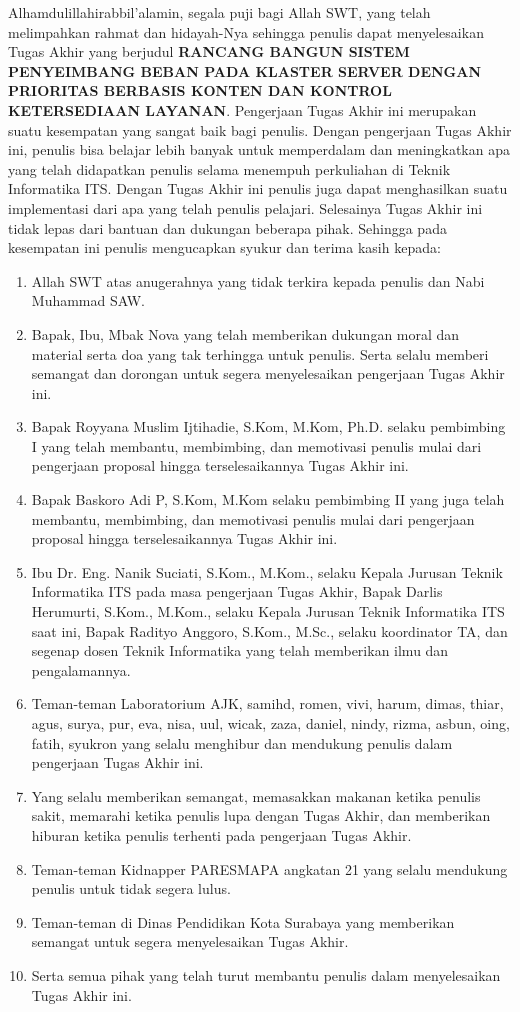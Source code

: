 \documentclass{ta-its}
\begin{document}
        Alhamdulillahirabbil’alamin, segala puji bagi Allah SWT, yang telah melimpahkan rahmat dan hidayah-Nya sehingga penulis dapat menyelesaikan Tugas Akhir yang berjudul \textbf{RANCANG BANGUN SISTEM PENYEIMBANG BEBAN PADA KLASTER SERVER DENGAN PRIORITAS BERBASIS KONTEN DAN KONTROL KETERSEDIAAN LAYANAN}. Pengerjaan Tugas Akhir ini merupakan suatu kesempatan yang sangat baik bagi penulis. Dengan pengerjaan Tugas Akhir ini, penulis bisa belajar lebih banyak untuk memperdalam dan meningkatkan apa yang telah didapatkan penulis selama menempuh perkuliahan di Teknik Informatika ITS. Dengan Tugas Akhir ini penulis juga dapat menghasilkan suatu implementasi dari apa yang telah penulis pelajari.
        Selesainya Tugas Akhir ini tidak lepas dari bantuan dan dukungan beberapa pihak. Sehingga pada kesempatan ini penulis mengucapkan syukur dan terima kasih kepada:
        \begin{enumerate}
        	\item Allah SWT atas anugerahnya yang tidak terkira kepada penulis dan Nabi Muhammad SAW.
        	\item Bapak, Ibu, Mbak Nova yang telah memberikan dukungan moral dan material serta doa yang tak terhingga untuk penulis. Serta selalu memberi semangat dan dorongan untuk segera menyelesaikan pengerjaan Tugas Akhir ini.
        	\item Bapak Royyana Muslim Ijtihadie, S.Kom, M.Kom, Ph.D. selaku pembimbing I yang telah membantu, membimbing, dan memotivasi penulis mulai dari pengerjaan proposal hingga terselesaikannya Tugas Akhir ini.
        	\item Bapak Baskoro Adi P, S.Kom, M.Kom selaku pembimbing II yang juga telah membantu, membimbing, dan memotivasi penulis mulai dari pengerjaan proposal hingga terselesaikannya Tugas Akhir ini.
        	\item Ibu Dr. Eng. Nanik Suciati, S.Kom., M.Kom., selaku Kepala Jurusan Teknik Informatika ITS pada masa pengerjaan Tugas Akhir, Bapak Darlis Herumurti, S.Kom., M.Kom., selaku Kepala Jurusan Teknik Informatika ITS saat ini, Bapak Radityo Anggoro, S.Kom., M.Sc., selaku koordinator TA, dan segenap dosen Teknik Informatika yang telah memberikan ilmu dan pengalamannya.
        	\item Teman-teman Laboratorium AJK, samihd, romen, vivi, harum, dimas, thiar, agus, surya, pur, eva, nisa, uul, wicak, zaza, daniel, nindy, rizma, asbun, oing, fatih, syukron yang selalu menghibur dan mendukung penulis dalam pengerjaan Tugas Akhir ini.
        	\item Yang selalu memberikan semangat, memasakkan makanan ketika penulis sakit, memarahi ketika penulis lupa dengan Tugas Akhir, dan memberikan hiburan ketika penulis terhenti pada pengerjaan Tugas Akhir.
        	\item Teman-teman Kidnapper PARESMAPA angkatan 21 yang selalu mendukung penulis untuk tidak segera lulus.
        	\item Teman-teman di Dinas Pendidikan Kota Surabaya yang memberikan semangat untuk segera menyelesaikan Tugas Akhir.
        	\item Serta semua pihak yang telah turut membantu penulis dalam menyelesaikan Tugas Akhir ini.
        \end{enumerate}
        
\end{document}

